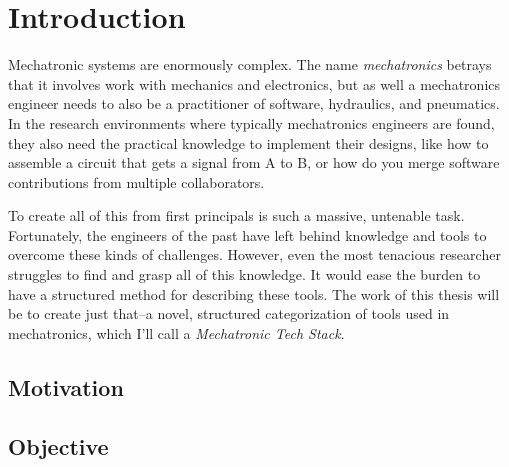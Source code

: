 \documentclass[english,12pt,a4paper,pdftex,eng,utf8]{aaltothesis}
\begin{document}
\cleardoublepage
\storeinipagenumber
{}
\setcounter{page}{1}



\section{Introduction}

\thispagestyle{empty}

Mechatronic systems are enormously complex.  The name {\it mechatronics} betrays that it involves work with mechanics and electronics, but as well a mechatronics engineer needs to also be a practitioner of software, hydraulics, and pneumatics.  In the research environments where typically mechatronics engineers are found, they also need the practical knowledge to implement their designs, like how to assemble a circuit that gets a signal from A to B, or how do you merge software contributions from multiple collaborators.

To create all of this from first principals is such a massive, untenable task.  Fortunately, the engineers of the past have left behind knowledge and tools to overcome these kinds of challenges.  However, even the most tenacious researcher struggles to find and grasp all of this knowledge.  It would ease the burden to have a structured method for describing these tools.  The work of this thesis will be to create just that--a novel, structured categorization of tools used in mechatronics, which I'll call a {\it Mechatronic Tech Stack}.

\subsection{Motivation}

\lipsum[1-3]

\subsection{Objective}

\lipsum[1-3]
\end{document}

